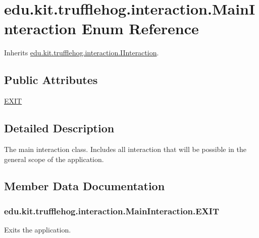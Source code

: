\hypertarget{enumedu_1_1kit_1_1trufflehog_1_1interaction_1_1_main_interaction}{}\section{edu.\+kit.\+trufflehog.\+interaction.\+Main\+Interaction Enum Reference}
\label{enumedu_1_1kit_1_1trufflehog_1_1interaction_1_1_main_interaction}


Inherits \hyperlink{interfaceedu_1_1kit_1_1trufflehog_1_1interaction_1_1_i_interaction}{edu.\+kit.\+trufflehog.\+interaction.\+I\+Interaction}.

\subsection*{Public Attributes}
\begin{DoxyCompactItemize}
\item 
\hyperlink{enumedu_1_1kit_1_1trufflehog_1_1interaction_1_1_main_interaction_a26160da4a547eac60048eec6c8ddf154}{E\+X\+I\+T}
\end{DoxyCompactItemize}


\subsection{Detailed Description}
The main interaction class. Includes all interaction that will be possible in the general scope of the application. 

\subsection{Member Data Documentation}
\hypertarget{enumedu_1_1kit_1_1trufflehog_1_1interaction_1_1_main_interaction_a26160da4a547eac60048eec6c8ddf154}{}
\subsubsection[{E\+X\+I\+T}]{\setlength{\rightskip}{0pt plus 5cm}edu.\+kit.\+trufflehog.\+interaction.\+Main\+Interaction.\+E\+X\+I\+T}\label{enumedu_1_1kit_1_1trufflehog_1_1interaction_1_1_main_interaction_a26160da4a547eac60048eec6c8ddf154}
Exits the application. 